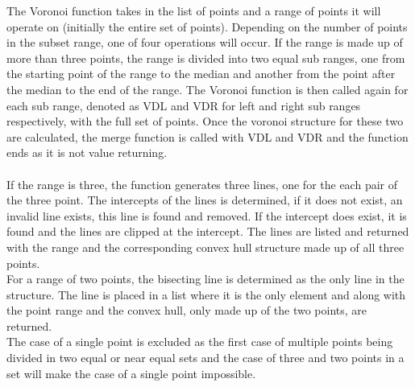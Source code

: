 The Voronoi function takes in the list of points and a range of points it will operate on (initially the entire set of points). Depending on the number of points in the subset range, one of four operations will occur. If the range is made up of more than three points, the range is divided into two equal sub ranges, one from the starting point of the range to the median and another from the point after the median to the end of the range. The Voronoi function is then called again for each sub range, denoted as VDL and VDR for left and right sub ranges respectively, with the full set of points. Once the voronoi structure for these two are calculated, the merge function is called with VDL and VDR and the function ends as it is not value returning.
\\
\\
If the range is three, the function generates three lines, one for the each pair of the three point. The intercepts of the lines is determined, if it does not exist, an invalid line exists, this line is found and removed. If the intercept does exist, it is found and the lines are clipped at the intercept. The lines are listed and returned with the range and the corresponding convex hull structure made up of all three points.
\\
For a range of two points, the bisecting line is determined as the only line in the structure. The line is placed in a list where it is the only element and along with the point range and the convex hull, only made up of the two points, are returned.
\\
The case of a single point is excluded as the first case of multiple points being divided in two equal or near equal sets and the case of three and two points in a set will make the case of a single point impossible.

